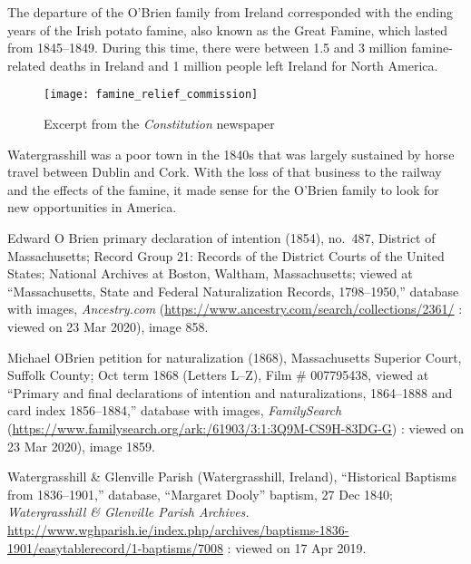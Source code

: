 {{The departure of the O'Brien family from Ireland corresponded with the ending years of the Irish potato famine, also known as the Great Famine, which lasted from 1845--1849. During this time, there were between 1.5 and 3 million famine-related deaths in Ireland and 1 million people left Ireland for North America.\cite{Smith:469}

\begin{figure}
	\centering
	\texttt{[image: famine\_relief\_commission]}
	\caption{Excerpt from the \textit{Constitution} newspaper}
	\label{fig:FamineRelief}
\end{figure}

Watergrasshill was a poor town in the 1840s that was largely sustained by horse travel between Dublin and Cork. With the loss of that business to the railway and the effects of the famine, it made sense for the O'Brien family to look for new opportunities in America.

\begin{thebibliography}{999}

Edward O Brien primary declaration of intention (1854), no.\ 487, 
District of Massachusetts; 
Record Group 21: Records of the District Courts of the United States; 
National Archives at Boston, Waltham, Massachusetts;
viewed at ``Massachusetts, State and Federal Naturalization Records, 1798--1950,''
database with images, \textit{Ancestry.com} (\url{https://www.ancestry.com/search/collections/2361/} : viewed on 23 Mar 2020), image 858.

Michael OBrien petition for naturalization (1868), 
Massachusetts Superior Court, Suffolk County; 
Oct term 1868 (Letters L--Z), Film \# 007795438,
viewed at ``Primary and final declarations of intention and naturalizations, 1864--1888 and card index 1856--1884,''
database with images, \textit{FamilySearch} (\url{https://www.familysearch.org/ark:/61903/3:1:3Q9M-CS9H-83DG-G}) : viewed on 23 Mar 2020), image 1859.

Watergrasshill \& Glenville Parish (Watergrasshill, Ireland), ``Historical Baptisms from 1836--1901,'' database, ``Margaret Dooly'' baptism, 27 Dec 1840; \textit{Watergrasshill \& Glenville Parish Archives.} \url{http://www.wghparish.ie/index.php/archives/baptisms-1836-1901/easytablerecord/1-baptisms/7008} : viewed on 17 Apr 2019.


\end{thebibliography}}}
